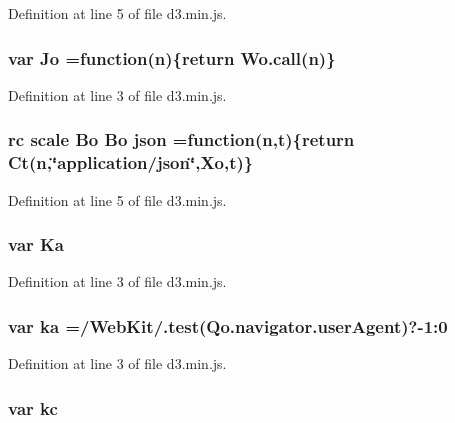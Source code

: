 Definition at line 5 of file d3.\+min.\+js.

\subsubsection[{Jo}]{\setlength{\rightskip}{0pt plus 5cm}var Jo =function({\bf n})\{{\bf return} {\bf Wo.\+call}({\bf n})\}}\label{d3_8min_8js_a04e6d565428b1b2f4bd2db8af24f2d8b}


Definition at line 3 of file d3.\+min.\+js.

\subsubsection[{json}]{ {\bf rc} {\bf scale} {\bf Bo} {\bf Bo} json =function({\bf n},t)\{{\bf return} Ct({\bf n},\char`\"{}application/json\char`\"{},Xo,t)\}}\label{d3_8min_8js_a6e654e61e720815b6f7db3d2d8112a06}


Definition at line 5 of file d3.\+min.\+js.

\subsubsection[{Ka}]{\setlength{\rightskip}{0pt plus 5cm}var Ka}\label{d3_8min_8js_a1aaba059932742f0c47b9f7b217f2bbe}


Definition at line 3 of file d3.\+min.\+js.

\subsubsection[{ka}]{\setlength{\rightskip}{0pt plus 5cm}var ka =/Web\+Kit/.test(Qo.\+navigator.\+user\+Agent)?-\/1\+:0}\label{d3_8min_8js_a9972fc27207ebe5dd0b1c33e686a87b5}


Definition at line 3 of file d3.\+min.\+js.

\subsubsection[{kc}]{\setlength{\rightskip}{0pt plus 5cm}var kc}\label{d3_8min_8js_aba61c5e2c586c116d0678211f6074ee8}


